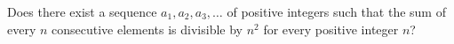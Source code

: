 Does there exist a sequence $a_1,a_2,a_3,\ldots $ of positive integers such that the sum of every $n$ consecutive elements is divisible by $n^2$ for every positive integer $n$?